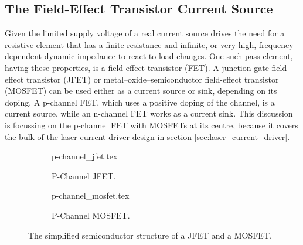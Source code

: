 \subsection{The Field-Effect Transistor Current Source}%
\label{sec:mosfet_current_source}
Given the limited supply voltage of a real current source drives the need for a resistive element that has a finite resistance and infinite, or very high, frequency dependent dynamic impedance to react to load changes. One such pass element, having these properties, is a field-effect-transistor (FET). A junction-gate field-effect transistor (JFET) or metal–oxide–semiconductor field-effect transistor (MOSFET) can be used either as a current source or sink, depending on its doping. A p-channel FET, which uses a positive doping of the channel, is a current source, while an n-channel FET works as a current sink. This discussion is focussing on the p-channel FET with MOSFETs at its centre, because it covers the bulk of the laser current driver design in section \ref{sec:laser_current_driver}.

\begin{figure}[hb]
    \centering
    \begin{subfigure}{0.4\linewidth}
        \centering
        {p-channel_jfet.tex}
        \caption{P-Channel JFET.}
        \label{fig:pjfet}
    \end{subfigure}
    \begin{subfigure}{0.4\linewidth}
        \centering
        {p-channel_mosfet.tex}
        \caption{P-Channel MOSFET.}
        \label{fig:pmos}
    \end{subfigure}
    \caption{The simplified semiconductor structure of a JFET and a MOSFET.}
    \label{fig:FETs}
\end{figure}

